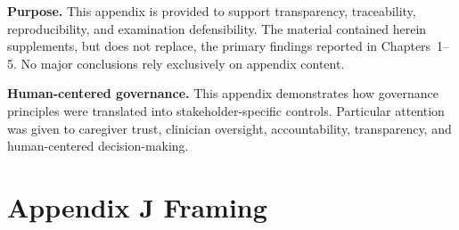 

\noindent\textbf{Purpose.} This appendix is provided to support transparency, traceability, reproducibility, and examination defensibility. The material contained herein supplements, but does not replace, the primary findings reported in Chapters~1--5. No major conclusions rely exclusively on appendix content.


\noindent\textbf{Human-centered governance.} This appendix demonstrates how governance principles were translated into stakeholder-specific controls. Particular attention was given to caregiver trust, clinician oversight, accountability, transparency, and human-centered decision-making.


\section*{Appendix J Framing}
\label{sec:appj_framing}

